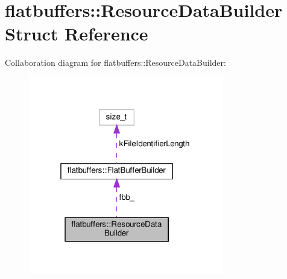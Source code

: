 \hypertarget{structflatbuffers_1_1ResourceDataBuilder}{}\section{flatbuffers\+:\+:Resource\+Data\+Builder Struct Reference}
\label{structflatbuffers_1_1ResourceDataBuilder}


Collaboration diagram for flatbuffers\+:\+:Resource\+Data\+Builder\+:
\nopagebreak
\begin{figure}[H]
\begin{center}
\leavevmode
\includegraphics[width=241pt]{structflatbuffers_1_1ResourceDataBuilder__coll__graph}
\end{center}
\end{figure}
